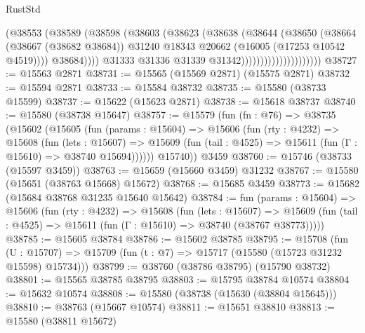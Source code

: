 \begin{lexlean}{RustStd}
\begin{coremodule}
                                        (@38553
                                          (@38589
                                            (@38598
                                              (@38603
                                                (@38623
                                                  (@38638
                                                    (@38644
                                                      (@38650
                                                        (@38664
                                                          (@38667 (@38682 @38684))
                                                          @31240
                                                          @18343
                                                          @20662
                                                          (@16005 (@17253 @10542 @4519))))
                                                      @38684))))
                                              @31333
                                              @31336
                                              @31339
                                              @31342)))))))))))))))))))))
@38727 := @15563 @2871
@38731 := @15565 (@15569 @2871) (@15575 @2871)
@38732 := @15594 @2871
@38733 := @15584 @38732
@38735 := @15580 (@38733 @15599)
@38737 := @15622 (@15623 @2871)
@38738 := @15618 @38737
@38740 := @15580 (@38738 @15647)
@38757 := @15579
    (fun (fn : @76) =>
    @38735
      (@15602
        (@15605
          (fun (params : @15604) =>
          @15606
            (fun (rty : @4232) =>
            @15608
              (fun (lets : @15607) =>
              @15609 (fun (tail : @4525) => @15611 (fun (Γ : @15610) => @38740 @15694))))))
        @15740))
    @3459
@38760 := @15746 (@38733 (@15597 @3459))
@38763 := @15659 (@15660 @3459) @31232
@38767 := @15580 (@15651 (@38763 @15668) @15672)
@38768 := @15685 @3459
@38773 := @15682 (@15684 @38768 @31235 @15640 @15642)
@38784 := fun (params : @15604) =>
  @15606
    (fun (rty : @4232) =>
    @15608
      (fun (lets : @15607) =>
      @15609 (fun (tail : @4525) => @15611 (fun (Γ : @15610) => @38740 (@38767 @38773)))))
@38785 := @15605 @38784
@38786 := @15602 @38785
@38795 := @15708
    (fun (U : @15707) => @15709 (fun (t : @7) => @15717 (@15580 (@15723 @31232 @15598) @15734)))
@38799 := @38760 (@38786 @38795) (@15790 @38732)
@38801 := @15565 @38785 @38795
@38803 := @15795 @38784 @10574
@38804 := @15632 @10574
@38808 := @15580 (@38738 (@15630 (@38804 @15645)))
@38810 := @38763 (@15667 @10574)
@38811 := @15651 @38810
@38813 := @15580 (@38811 @15672)

\end{coremodule}
\end{lexlean}
